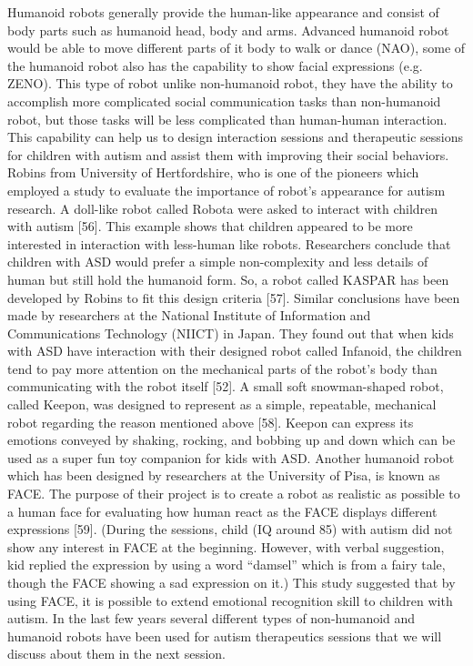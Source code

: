 Humanoid robots generally provide the human-like appearance and consist of body parts such as humanoid head, body and arms. Advanced humanoid robot would be able to move different parts of it body to walk or dance (NAO), some of the humanoid robot also has the capability to show facial expressions (e.g. ZENO). This type of robot unlike non-humanoid robot, they have the ability to accomplish more complicated social communication tasks than non-humanoid robot, but those tasks will be less complicated than human-human interaction. This capability can help us to design interaction sessions and therapeutic sessions for children with autism and assist them with improving their social behaviors.
Robins from University of Hertfordshire, who is one of the pioneers which employed a study to evaluate the importance of robot’s appearance for autism research. A doll-like robot called Robota were asked to interact with children with autism [56]. This example shows that children appeared to be more interested in interaction with less-human like robots. Researchers conclude that children with ASD would prefer a simple non-complexity and less details of human but still hold the humanoid form. So, a robot called KASPAR has been developed by Robins to fit this design criteria [57].
Similar conclusions have been made by researchers at the National Institute of Information and Communications Technology (NIICT) in Japan. They found out that when kids with ASD have interaction with their designed robot called Infanoid, the children tend to pay more attention on the mechanical parts of the robot’s body than communicating with the robot itself [52]. A small soft snowman-shaped robot, called Keepon, was designed to represent as a simple, repeatable, mechanical robot regarding the reason mentioned above [58]. Keepon can express its emotions conveyed by shaking, rocking, and bobbing up and down which can be used as a super fun toy companion for kids with ASD. Another humanoid robot which has been designed by researchers at the University of Pisa, is known as FACE. The purpose of their project is to create a robot as realistic as possible to a human face for evaluating how human react as the FACE displays different expressions [59]. (During the sessions, child (IQ around 85) with autism did not show any interest in FACE at the beginning. However, with verbal suggestion, kid replied the expression by using a word “damsel” which is from a fairy tale, though the FACE showing a sad expression on it.) This study suggested that by using FACE, it is possible to extend emotional recognition skill to children with autism.
In the last few years several different types of non-humanoid and humanoid robots have been used for autism therapeutics sessions that we will discuss about them in the next session.
